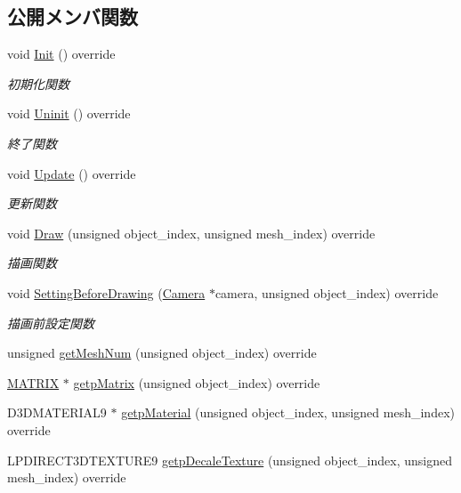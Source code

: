\subsection*{公開メンバ関数}
\begin{DoxyCompactItemize}
\item 
void \mbox{\hyperlink{class_coin_draw_ad0f5da5cfb896541fd59b1ab4a8593d1}{Init}} () override
\begin{DoxyCompactList}\small\item\em 初期化関数 \end{DoxyCompactList}\item 
void \mbox{\hyperlink{class_coin_draw_a6484c22a5598e298f18e7cd6083cd551}{Uninit}} () override
\begin{DoxyCompactList}\small\item\em 終了関数 \end{DoxyCompactList}\item 
void \mbox{\hyperlink{class_coin_draw_a6157b17bf1706b85156aad0d88acfd7e}{Update}} () override
\begin{DoxyCompactList}\small\item\em 更新関数 \end{DoxyCompactList}\item 
void \mbox{\hyperlink{class_coin_draw_ac7d91fecb6845cebe276eb81a4953563}{Draw}} (unsigned object\+\_\+index, unsigned mesh\+\_\+index) override
\begin{DoxyCompactList}\small\item\em 描画関数 \end{DoxyCompactList}\item 
void \mbox{\hyperlink{class_coin_draw_a66c03acd675ac1820977cb21015abfdb}{Setting\+Before\+Drawing}} (\mbox{\hyperlink{class_camera}{Camera}} $\ast$camera, unsigned object\+\_\+index) override
\begin{DoxyCompactList}\small\item\em 描画前設定関数 \end{DoxyCompactList}\item 
unsigned \mbox{\hyperlink{class_coin_draw_a8ebedf2582d53b40016ebd3f0e82c38e}{get\+Mesh\+Num}} (unsigned object\+\_\+index) override
\item 
\mbox{\hyperlink{_vector3_d_8h_a032295cd9fb1b711757c90667278e744}{M\+A\+T\+R\+IX}} $\ast$ \mbox{\hyperlink{class_coin_draw_ad8cbbe87f4cf4428214f50492c731f5f}{getp\+Matrix}} (unsigned object\+\_\+index) override
\item 
D3\+D\+M\+A\+T\+E\+R\+I\+A\+L9 $\ast$ \mbox{\hyperlink{class_coin_draw_ad62dd6a9dd468342849a0c6ad5f8a5dd}{getp\+Material}} (unsigned object\+\_\+index, unsigned mesh\+\_\+index) override
\item 
L\+P\+D\+I\+R\+E\+C\+T3\+D\+T\+E\+X\+T\+U\+R\+E9 \mbox{\hyperlink{class_coin_draw_af99db1c0db2ed6b3ba429f23cd44279b}{getp\+Decale\+Texture}} (unsigned object\+\_\+index, unsigned mesh\+\_\+index) override
\end{DoxyCompactItemize}
